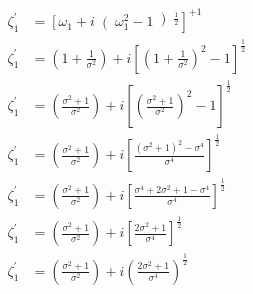 





\begin{align}
\label{apIV_eq:13}
\zeta_{1}^{'} & = \left[\omega_{1} + i\right(\omega_{1}^{2} - 1\left)^{\frac{1}{2}}\right]^{+1} \\
\zeta_{1}^{'} & = \left(1 + \frac{1}{\sigma^{2}}\right) + i \left[ \left(1 + \frac{1}{\sigma^{2}}\right)^{2} - 1 \right]^\frac{1}{2} \\
\zeta_{1}^{'} & = \left(\frac{\sigma^{2} + 1}{\sigma^{2}}\right) + i \left[ \left(\frac{\sigma^{2} + 1}{\sigma^{2}}\right)^{2} - 1 \right]^\frac{1}{2} \\
\zeta_{1}^{'} & = \left(\frac{\sigma^{2} + 1}{\sigma^{2}}\right) + i \left[ \frac{\left( \sigma^{2} + 1 \right)^{2} - \sigma^{4}}{\sigma^{4}} \right]^\frac{1}{2} \\
\zeta_{1}^{'} & = \left(\frac{\sigma^{2} + 1}{\sigma^{2}}\right) + i \left[ \frac{\sigma^{4} + 2\sigma^{2} + 1 - \sigma^{4}}{\sigma^{4}} \right]^\frac{1}{2} \\
\zeta_{1}^{'} & = \left(\frac{\sigma^{2} + 1}{\sigma^{2}}\right) + i \left[ \frac{2\sigma^{2} + 1}{\sigma^{4}} \right]^\frac{1}{2} \\
\zeta_{1}^{'} & = \left(\frac{\sigma^{2} + 1}{\sigma^{2}}\right) + i \left( \frac{2\sigma^{2} + 1}{\sigma^{4}} \right)^\frac{1}{2}
\end{align}

